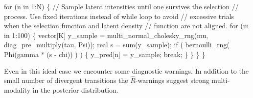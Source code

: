 \documentclass[
  letterpaper,
  DIV=11,
  numbers=noendperiod]{scrartcl}
\newenvironment{Shaded}{\begin{snugshade}}{\end{snugshade}}
\newcommand{\AttributeTok}[1]{\textcolor[rgb]{0.40,0.45,0.13}{#1}}
\newcommand{\CommentTok}[1]{\textcolor[rgb]{0.37,0.37,0.37}{#1}}
\newcommand{\ControlFlowTok}[1]{\textcolor[rgb]{0.00,0.23,0.31}{#1}}
\newcommand{\DataTypeTok}[1]{\textcolor[rgb]{0.68,0.00,0.00}{#1}}
\newcommand{\DecValTok}[1]{\textcolor[rgb]{0.68,0.00,0.00}{#1}}
\newcommand{\FunctionTok}[1]{\textcolor[rgb]{0.28,0.35,0.67}{#1}}
\newcommand{\NormalTok}[1]{\textcolor[rgb]{0.00,0.23,0.31}{#1}}
\newcommand{\OtherTok}[1]{\textcolor[rgb]{0.00,0.23,0.31}{#1}}
\newcommand{\SpecialCharTok}[1]{\textcolor[rgb]{0.37,0.37,0.37}{#1}}
\newcommand{\StringTok}[1]{\textcolor[rgb]{0.13,0.47,0.30}{#1}}
\begin{document}
\begin{codelisting}
\begin{Shaded}
\begin{Highlighting}[]
  \ControlFlowTok{for}\NormalTok{ (n }\ControlFlowTok{in} \DecValTok{1}\NormalTok{:N) \{}
    \CommentTok{// Sample latent intensities until one survives the selection}
    \CommentTok{// process.  Use fixed iterations instead of while loop to avoid }
    \CommentTok{// excessive trials when the selection function and latent density }
    \CommentTok{// function are not aligned.}
    \ControlFlowTok{for}\NormalTok{ (m }\ControlFlowTok{in} \DecValTok{1}\NormalTok{:}\DecValTok{100}\NormalTok{) \{}
      \DataTypeTok{vector}\NormalTok{[K] y\_sample }
\NormalTok{        = multi\_normal\_cholesky\_rng(mu, diag\_pre\_multiply(tau, Psi));}
      \DataTypeTok{real}\NormalTok{ s = sum(y\_sample);}
      \ControlFlowTok{if}\NormalTok{ ( bernoulli\_rng( Phi(gamma * (s {-} chi)) ) ) \{}
\NormalTok{        y\_pred[n] = y\_sample;}
        \ControlFlowTok{break}\NormalTok{;}
\NormalTok{      \}}
\NormalTok{    \}}
\NormalTok{  \}}
\NormalTok{\}}
\end{Highlighting}
\end{Shaded}

\end{codelisting}

\begin{Shaded}
\end{Shaded}

Even in this ideal case we encounter some diagnostic warnings. In
addition to the small number of divergent transitions the
\(\hat{R}\)-warnings suggest strong multi-modality in the posterior
distribution.

\begin{Shaded}
\end{Shaded}
\end{document}
